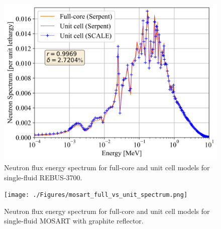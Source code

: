 \documentclass{anstrans}
\begin{document}
\begin{figure}[!htb]
  \centering
  \includegraphics[scale=0.58]{./Figures/rebus_full_vs_unit_spectrum.png}
        \vspace{-0.25in}
  \caption{Neutron flux energy spectrum for full-core and unit cell models for single-fluid REBUS-3700.}   
  \vspace{-0.2in}
  \label{fig:spectrum_rebus}
\end{figure}
\begin{figure}[!htb]
  \centering
  \texttt{[image: ./Figures/mosart\_full\_vs\_unit\_spectrum.png]}
        \vspace{-0.25in}
  \caption{Neutron flux energy spectrum for full-core and unit cell models for single-fluid \gls{MOSART} with graphite reflector.}   
  \label{fig:spectrum_mosart}
\end{figure}
\end{document}
